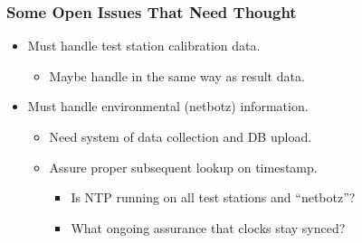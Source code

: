 \documentclass[xcolor=dvipsnames]{beamer}
\begin{document}
\begin{frame}
  \frametitle{Some Open Issues That Need Thought}
  \begin{itemize}
  \item Must handle test station calibration data.
    \begin{itemize}
    \item Maybe handle in the same way as result data.
    \end{itemize}
  \item Must handle environmental (netbotz) information.
    \begin{itemize}
    \item Need system of data collection and DB upload.
    \item Assure proper subsequent lookup on timestamp.
      \begin{itemize}
      \item Is NTP running on all test stations and ``netbotz''?
      \item What ongoing assurance that clocks stay synced?
      \end{itemize}
    \end{itemize}
  \end{itemize}
\end{frame}
\end{document}
